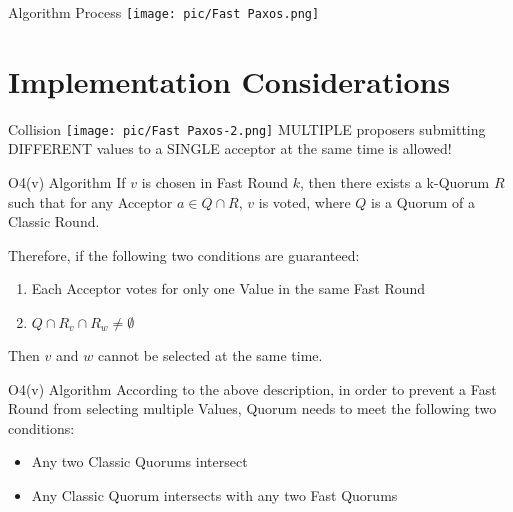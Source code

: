 \documentclass[10pt]{beamer}
\begin{document}
\begin{frame}[fragile]{Algorithm Process}
    \texttt{[image: pic/Fast Paxos.png]}
\end{frame}

\section{Implementation Considerations}

\begin{frame}[fragile]{Collision}
    \texttt{[image: pic/Fast Paxos-2.png]}
    MULTIPLE proposers submitting DIFFERENT values to a SINGLE acceptor at the same time is allowed!
\end{frame}

\begin{frame}[fragile]{O4(v) Algorithm}
    If $v$ is chosen in Fast Round $k$, then there exists a k-Quorum $R$ such that for any Acceptor $a \in Q \cap R$, $v$ is voted, where $Q$ is a Quorum of a Classic Round.

    Therefore, if the following two conditions are guaranteed:
    \begin{enumerate}
        \item Each Acceptor votes for only one Value in the same Fast Round
        \item $Q \cap R_v \cap R_w \ne \emptyset$
    \end{enumerate}
    Then $v$ and $w$ cannot be selected at the same time.
\end{frame}

\begin{frame}[fragile]{O4(v) Algorithm}
    According to the above description, in order to prevent a Fast Round from selecting multiple Values, Quorum needs to meet the following two conditions:
    \begin{itemize}
        \item Any two Classic Quorums intersect
        \item Any Classic Quorum intersects with any two Fast Quorums
    \end{itemize}
\end{frame}
\end{document}
